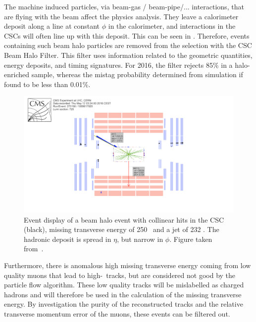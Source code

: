 The machine induced particles, via beam-gas / beam-pipe/... interactions, that are flying with the beam affect the physics analysis. They leave a calorimeter deposit along a line at constant $\phi$ in the calorimeter, and interactions in the CSCs will often line up with this deposit. This can be seen in . Therefore, events containing such beam halo particles are removed from the selection with the CSC Beam Halo Filter. This filter uses information related to the geometric quantities, energy deposits, and timing signatures. For 2016, the filter rejects 85\% in a halo-enriched sample, whereas the mistag probability determined from simulation if found to  be less than 0.01\%.  
\begin{figure}[htbp]
	\centering
	\includegraphics[width=1.\linewidth]{5_EventSelection/Figures/Figure_004}
	\caption{Event display of a beam halo event with collinear hits in the CSC (black), missing transverse energy of 250 \GeV\, and a jet of 232 \GeV. The hadronic deposit is spread in $\eta$, but narrow in $\phi$. Figure taken from~\cite{CMS-PAS-JME-16-004}. }
	\label{fig:beamhalo}
\end{figure}

Furthermore, there is anomalous high missing transverse energy coming from low quality muons that lead to high-\pt\ tracks, but are considered not good by the particle flow algorithm. These low quality tracks will be  mislabelled as charged hadrons and will therefore be used in the calculation of the missing transverse energy. By investigation the purity of the reconstructed tracks and the relative transverse momentum error of the muons, these events can be filtered out. 




